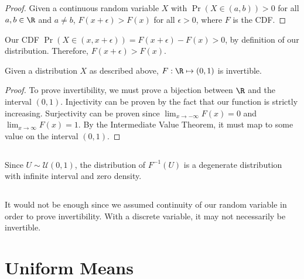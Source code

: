 \documentclass{article}
\begin{document}
\subsection{}

\begin{proof}
    Given a continuous random variable \(X\) with \(\Pr(X \in (a, b)) > 0\) for all \(a, b \in \R\) and \(a \neq b\), \(F(x + \epsilon) > F(x)\) for all \(\epsilon > 0\), where \(F\) is the CDF.
\end{proof}
\begin{theorem}
    Our CDF \(\Pr(X \in (x, x + \epsilon)) = F(x + \epsilon) - F(x) > 0\), by definition of our distribution.
    Therefore, \(F(x + \epsilon) > F(x)\).
\end{theorem}
\begin{theorem}
    Given a distribution \(X\) as described above, \(F : \R \mapsto (0, 1)\) is invertible.
\end{theorem}
\begin{proof}
    To prove invertibility, we must prove a bijection between \(\R\) and the interval \((0, 1)\).
    Injectivity can be proven by the fact that our function is strictly increasing.
    Surjectivity can be proven since \(\lim_{x \to -\infty} F(x) = 0\) and \(\lim_{x \to \infty} F(x) = 1\).
    By the Intermediate Value Theorem, it must map to some value on the interval \((0, 1)\).
\end{proof}

\subsection{}

Since \(U \sim \mathcal{U}(0, 1)\), the distribution of \(F^{-1}(U)\) is a degenerate distribution with infinite interval and zero density.

\subsection{}

It would not be enough since we assumed continuity of our random variable in order to prove invertibility.
With a discrete variable, it may not necessarily be invertible.

\section{Uniform Means}

\subsection{}
\end{document}
